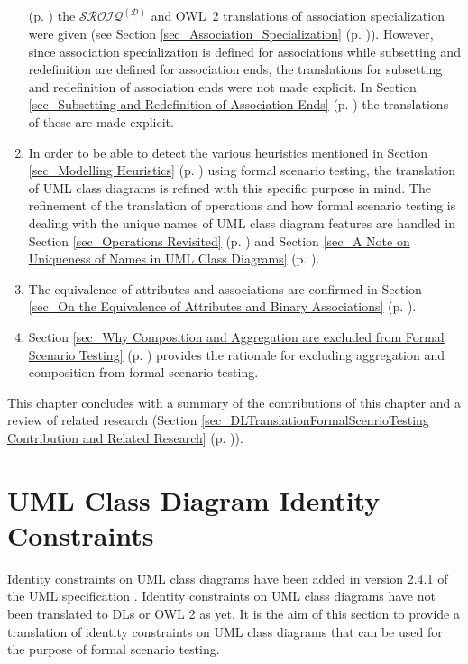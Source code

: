 \begin{enumerate}
 (p. \pageref{chap_DL Translations of UML Class Diagrams}) the $\mathcal{SROIQ^{(\mathcal{D})}}$ and OWL~2 translations of association specialization were given (see Section \ref{sec_Association_Specialization} 
 (p. \pageref{sec_Association_Specialization})). However, since association specialization is defined for associations while subsetting and redefinition are defined for association ends,  
 the translations for subsetting and redefinition of association ends were not made explicit. 
 In Section \ref{sec_Subsetting and Redefinition of Association Ends} 
 (p. \pageref{sec_Subsetting and Redefinition of Association Ends}) the translations of these are made explicit.
 \item In order to be able to detect the various heuristics mentioned in Section \ref{sec_Modelling Heuristics}
 (p. \pageref{sec_Modelling Heuristics}) using formal scenario testing, the translation of UML class diagrams is refined with this specific purpose in mind. 
 The refinement of the translation of operations and how formal scenario testing is dealing with the unique names of UML class diagram features are handled 
 in Section \ref{sec_Operations Revisited} (p. \pageref{sec_Operations Revisited}) 
 and Section \ref{sec_A Note on Uniqueness of Names in UML Class Diagrams} (p. \pageref{sec_A Note on Uniqueness of Names in UML Class Diagrams}).
 \item The equivalence of attributes and associations are confirmed in Section \ref{sec_On the Equivalence of Attributes and Binary Associations} 
 (p. \pageref{sec_On the Equivalence of Attributes and Binary Associations}).
 \item Section \ref{sec_Why Composition and Aggregation are excluded from Formal Scenario Testing} (p. \pageref{sec_Why Composition and Aggregation are excluded from Formal Scenario Testing})
 provides the rationale for excluding aggregation and composition from formal scenario testing.
\end{enumerate}

This chapter concludes with a summary of the contributions of this chapter and a review of related research (Section \ref{sec_DLTranslationFormalScenrioTesting Contribution and Related Research} 
 (p. \pageref{sec_DLTranslationFormalScenrioTesting Contribution and Related Research})).


\section{UML Class Diagram Identity Constraints} \label{sec_UML Class Diagram ID Constraints}
Identity constraints on UML class diagrams have been added in version 2.4.1 of the UML specification \cite{ISO-UMLSuper2.4.1}. Identity constraints on UML class diagrams have not been translated to DLs or 
OWL 2 as yet. It is the aim of this section to provide a translation of identity constraints on UML class diagrams that can be used for the purpose of formal scenario testing.

